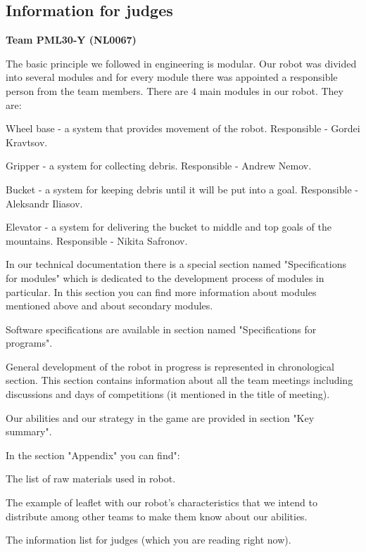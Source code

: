 \subsection{Information for judges}

\large{\textbf{Team PML30-Y (NL0067)}}

The basic principle we followed in engineering is modular. Our robot was divided into several modules and for every module there was appointed a responsible person from the team members. There are 4 main modules in our robot. They are:

\begin{enumerate*}
	
	\item Wheel base - a system that provides movement of the robot. Responsible - Gordei Kravtsov.
	
	\item Gripper - a system for collecting debris. Responsible - Andrew Nemov.
	
	\item Bucket - a system for keeping debris until it will be put into a goal. Responsible - Aleksandr Iliasov.
	
	\item Elevator - a system for delivering the bucket to middle and top goals of the mountains. Responsible - Nikita Safronov.
	
\end{enumerate*}

In our technical documentation there is a special section named "Specifications for modules" which is dedicated to the development process of modules in particular. In this section you can find more information about modules mentioned above and about secondary modules.

Software specifications are available in section named "Specifications for programs".

General development of the robot in progress is represented in chronological section. This section contains information about all the team meetings including discussions and days of competitions (it mentioned in the title of meeting).

Our abilities and our strategy in the game are provided in section "Key summary".

In the section "Appendix" you can find":
\begin{enumerate*}
	\item The list of raw materials used in robot.
	
	\item The example of leaflet with our robot's characteristics that we intend to distribute among other teams to make them know about our abilities.
	
	\item The information list for judges (which you are reading right now).
	
\end{enumerate*}

